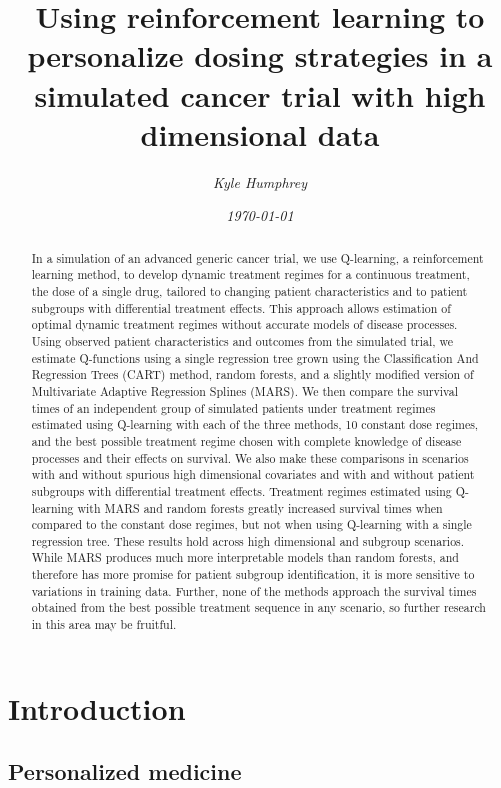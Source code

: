 \documentclass[12pt]{article}
\title{\normalfont \Large Using reinforcement learning to personalize dosing strategies in a simulated cancer trial with high dimensional data}
\author{\normalsize \sl Kyle Humphrey}
\date{\normalsize \sl \today}
\begin{document}
\maketitle

\begin{abstract}
In a simulation of an advanced generic cancer trial, we use Q-learning, a reinforcement learning method, to develop dynamic treatment regimes for a continuous treatment, the dose of a single drug, tailored to changing patient characteristics and to patient subgroups with differential treatment effects. This approach allows estimation of optimal dynamic treatment regimes without accurate models of disease processes. Using observed patient characteristics and outcomes from the simulated trial, we estimate Q-functions using a single regression tree grown using the Classification And Regression Trees (CART) method, random forests, and a slightly modified version of Multivariate Adaptive Regression Splines (MARS). We then compare the survival times of an independent group of simulated patients under treatment regimes estimated using Q-learning with each of the three methods, 10 constant dose regimes, and the best possible treatment regime chosen with complete knowledge of disease processes and their effects on survival. We also make these comparisons in scenarios with and without spurious high dimensional covariates and with and without patient subgroups with differential treatment effects. Treatment regimes estimated using Q-learning with MARS and random forests greatly increased survival times when compared to the constant dose regimes, but not when using Q-learning with a single regression tree. These results hold across high dimensional and subgroup scenarios. While MARS produces much more interpretable models than random forests, and therefore has more promise for patient subgroup identification, it is more sensitive to variations in training data. Further, none of the methods approach the survival times obtained from the best possible treatment sequence in any scenario, so further research in this area may be fruitful.
\end{abstract}

\tableofcontents
\listoffigures
\listoftables

\section{Introduction}

\subsection{Personalized medicine} %
\label{sub:personalized_medicine}
\end{document}
